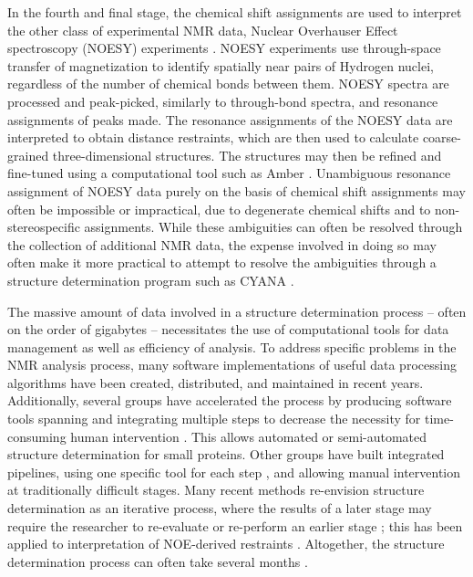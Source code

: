 In the fourth and final stage, the chemical shift assignments are used to 
interpret the other class of experimental NMR data, Nuclear Overhauser Effect 
spectroscopy (NOESY) experiments \cite{noe_kaiser}.  
NOESY experiments use through-space 
transfer of magnetization to identify spatially near pairs of Hydrogen nuclei, 
regardless of the number of chemical bonds between them.  NOESY spectra are 
processed and peak-picked, similarly to through-bond spectra, and resonance 
assignments of peaks made.  The resonance assignments of the NOESY data are 
interpreted to obtain distance restraints, which are then used to calculate 
coarse-grained three-dimensional structures.  The structures may then be 
refined and fine-tuned using a computational tool such as Amber \cite{amber}.  
Unambiguous resonance assignment of NOESY data purely on the basis of chemical 
shift assignments may often be impossible or impractical, due to degenerate 
chemical shifts and to non-stereospecific assignments.  While these 
ambiguities can often be resolved through the collection of additional 
NMR data, the expense involved in doing so may often make it more practical 
to attempt to resolve the ambiguities through a structure determination 
program such as CYANA \cite{cyana2004}.

The massive amount of data involved in a structure determination process --
often on the order of gigabytes -- necessitates the use of computational
tools for data management as well as efficiency of analysis.  To address
specific problems in the NMR analysis process, many software implementations 
of useful data processing algorithms have been created, distributed, and 
maintained in recent years.  Additionally, several groups have 
accelerated the process by producing software tools spanning and integrating 
multiple steps to decrease the necessity for time-consuming human intervention
\cite{abacus_assignment}.
This allows automated or semi-automated structure determination for small 
proteins.  Other groups have built integrated pipelines, using one specific 
tool for each step \cite{baran2004automated, sail_flya}, 
and allowing manual intervention at traditionally 
difficult stages.  Many recent methods re-envision structure determination 
as an iterative process, where the results of a later stage may require the 
researcher to re-evaluate or re-perform an earlier stage \cite{cyana2004}; 
this has been applied to interpretation of NOE-derived 
restraints \cite{aria2003}.  Altogether, the structure determination 
process can often take several months \cite{guerry2011automated}.


